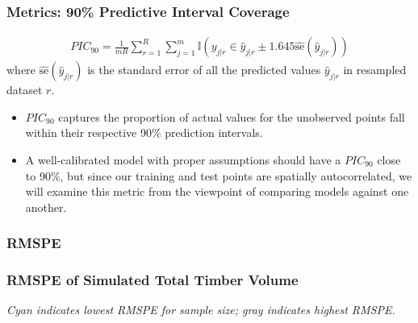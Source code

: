 \documentclass{beamer}
\begin{document}
\begin{frame}
	\frametitle{Metrics: 90\% Predictive Interval Coverage}
	\begin{align*}
		PIC_{90} = \frac{1}{mR} \sum_{r=1}^R \sum_{j=1}^m \mathbb{I}\left(y_{j|r} \in \hat{y}_{j|r} \pm 1.645\hat{\text{se}}(\hat{y}_{j|r}) \right)
	\end{align*}
	where $\hat{\text{se}}(\hat{y}_{j|r})$ is the standard error of all the predicted values $\hat{y}_{j|r}$ in resampled dataset $r$.\cite{verhoef13}
	\begin{itemize}
		\item $PIC_{90}$ captures the proportion of actual values for the unobserved points fall within their respective 90\% prediction intervals.
		\item A well-calibrated model with proper assumptions should have a $PIC_{90}$ close to 90\%, but since our training and test points are spatially autocorrelated, we will examine this metric from the viewpoint of comparing models against one another. 
	\end{itemize}
\end{frame}

\subsubsection{RMSPE}
\begin{frame}
	\frametitle{RMSPE of Simulated Total Timber Volume}
	\begin{center}
	\vspace{.06cm}

	\textit{Cyan indicates lowest RMSPE for sample size; gray indicates highest RMSPE.}
	\end{center}
\end{frame}
\end{document}
